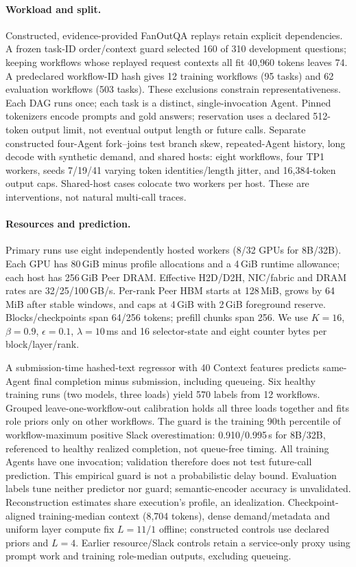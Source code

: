 \paragraph{Workload and split.}
Constructed, evidence-provided FanOutQA replays\cite{eval2024fanoutqa} retain
explicit dependencies. A frozen task-ID order/context guard selected 160 of
310 development questions; keeping workflows whose replayed request contexts all fit 40,960 tokens leaves
74. A predeclared workflow-ID hash gives 12 training workflows (95 tasks) and
62 evaluation workflows (503 tasks). These exclusions constrain
representativeness. Each DAG runs once; each task is a distinct,
single-invocation Agent. Pinned tokenizers encode prompts and gold answers;
reservation uses a declared 512-token output limit, not eventual output length
or future calls.
Separate constructed four-Agent fork--joins test branch skew, repeated-Agent
history, long decode with synthetic demand, and shared hosts: eight workflows,
four TP1 workers, seeds 7/19/41 varying token identities/length jitter, and
16,384-token output caps. Shared-host cases colocate two workers per host.
These are interventions, not natural multi-call traces.

\paragraph{Resources and prediction.}
Primary runs use eight independently hosted workers (8/32 GPUs for 8B/32B).
Each GPU has 80\,GiB minus profile allocations and a 4\,GiB runtime allowance;
each host has 256\,GiB Peer DRAM. Effective H2D/D2H, NIC/fabric and DRAM rates
are 32/25/100\,GB/s. Per-rank Peer HBM starts at 128\,MiB, grows by 64\,MiB
after stable windows, and caps at 4\,GiB with 2\,GiB foreground reserve.
Blocks/checkpoints span 64/256 tokens; prefill chunks span 256.
We use $K=16$, $\beta=0.9$, $\epsilon=0.1$, $\lambda=10$\,ms and
16 selector-state and eight counter bytes per block/layer/rank.

A submission-time hashed-text regressor with 40 Context features predicts
same-Agent final completion minus submission, including queueing. Six healthy
training runs (two models, three loads) yield 570 labels from 12 workflows.
Grouped leave-one-workflow-out calibration holds all three loads together and
fits role priors only on other workflows. The guard is the training 90th
percentile of workflow-maximum positive Slack overestimation: 0.910/0.995\,s
for 8B/32B, referenced to healthy realized completion, not queue-free timing.
All training Agents have one invocation; validation therefore does not test
future-call prediction. This empirical guard is not a probabilistic delay bound.
Evaluation labels tune neither predictor nor guard; semantic-encoder accuracy
is unvalidated. Reconstruction estimates share execution's profile, an idealization.
Checkpoint-aligned training-median context (8,704 tokens), dense demand/metadata and uniform
layer compute fix $L=11/1$ offline; constructed controls use declared priors
and $L=4$. Earlier resource/Slack controls retain a service-only proxy using
prompt work and training role-median outputs, excluding queueing.

